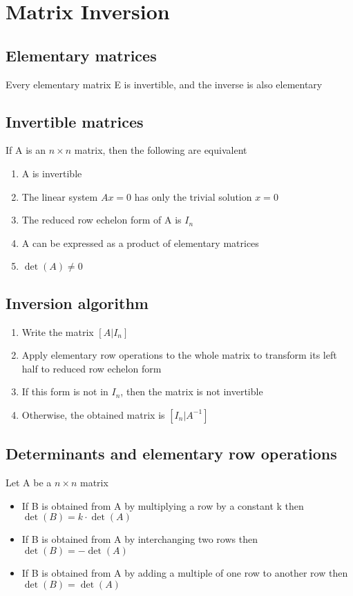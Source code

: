 \documentclass{article}[18pt]
\begin{document}
\section{Matrix Inversion}
\subsection{Elementary matrices}
Every elementary matrix E is invertible, and the inverse is also elementary
\subsection{Invertible matrices}
If A is an $n\times n$ matrix, then the following are equivalent
\begin{enumerate}
	\item A is invertible
	\item The linear system $Ax=0$ has only the trivial solution $x=0$
	\item The reduced row echelon form of A is $I_n$
	\item A can be expressed as a product of elementary matrices
	\item $\det(A)\neq 0$
\end{enumerate}
\subsection{Inversion algorithm}
\begin{enumerate}
	\item Write the matrix $[A|I_n]$
	\item Apply elementary row operations to the whole matrix to transform its left half to reduced row echelon form
	\item If this form is not in $I_n$, then the matrix is not invertible
	\item Otherwise, the obtained matrix is $[I_n|A^{-1}]$
\end{enumerate}
\subsection{Determinants and elementary row operations}
Let A be a $n\times n$ matrix
\begin{itemize}
	\item If B is obtained from A by multiplying a row by a constant k then $\det(B)=k\cdot \det(A)$
	\item If B is obtained from A by interchanging two rows then $\det(B)=-\det(A)$
	\item If B is obtained from A by adding a multiple of one row to another row then $\det(B)=\det(A)$
\end{itemize}
\end{document}
